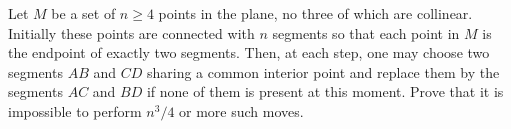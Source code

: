 Let $M$ be a set of $n \geq 4$ points in the plane, no three of which are collinear. Initially these points are connected with $n$ segments so that each point in $M$ is the endpoint of exactly two segments. Then, at each step, one may choose two segments $AB$ and $CD$ sharing a common interior point and replace them by the segments $AC$ and $BD$ if none of them is present at this moment. Prove that it is impossible to perform $n^3/4$ or more such moves.
